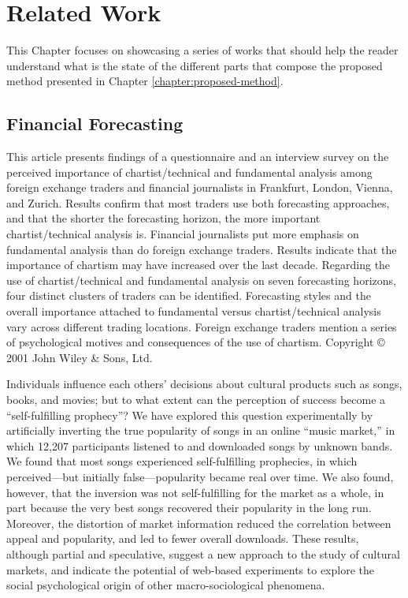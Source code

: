 \chapter{Related Work}
\label{chapter:related-work}

This Chapter focuses on showcasing a series of works that should help the reader
understand what is the state of the different parts that compose the proposed
method presented in Chapter \ref{chapter:proposed-method}.

\section{Financial Forecasting}
\label{section:financial-forecasting}

\cite{Kadiri2015} This article presents findings of a questionnaire and an
interview survey on the perceived importance of chartist/technical and
fundamental analysis among foreign exchange traders and financial journalists in
Frankfurt, London, Vienna, and Zurich. Results confirm that most traders use
both forecasting approaches, and that the shorter the forecasting horizon, the
more important chartist/technical analysis is. Financial journalists put more
emphasis on fundamental analysis than do foreign exchange traders. Results
indicate that the importance of chartism may have increased over the last
decade. Regarding the use of chartist/technical and fundamental analysis on
seven forecasting horizons, four distinct clusters of traders can be
identified. Forecasting styles and the overall importance attached to
fundamental versus chartist/technical analysis vary across different trading
locations. Foreign exchange traders mention a series of psychological motives
and consequences of the use of chartism. Copyright © 2001 John Wiley & Sons,
Ltd.

\cite{Salganik2008} Individuals influence each others’ decisions about cultural
products such as songs, books, and movies; but to what extent can the perception
of success become a “self-fulfilling prophecy”? We have explored this question
experimentally by artificially inverting the true popularity of songs in an
online “music market,” in which 12,207 participants listened to and downloaded
songs by unknown bands. We found that most songs experienced self-fulfilling
prophecies, in which perceived—but initially false—popularity became real over
time. We also found, however, that the inversion was not self-fulfilling for the
market as a whole, in part because the very best songs recovered their
popularity in the long run. Moreover, the distortion of market information
reduced the correlation between appeal and popularity, and led to fewer overall
downloads. These results, although partial and speculative, suggest a new
approach to the study of cultural markets, and indicate the potential of
web-based experiments to explore the social psychological origin of other
macro-sociological phenomena.

